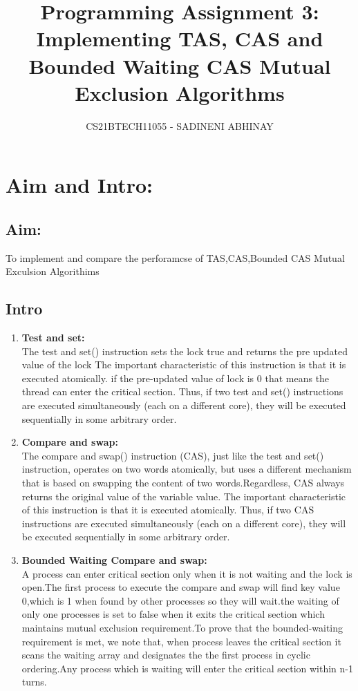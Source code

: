 \documentclass[10pt,a4paper]{article}
\title{
Programming Assignment 3:
Implementing TAS, CAS and Bounded Waiting CAS
Mutual Exclusion Algorithms }
\author{CS21BTECH11055 - SADINENI ABHINAY}
\begin{document}
	\maketitle
	\section{Aim and Intro:}
	\subsection{Aim:}
	To implement and compare the perforamcse of TAS,CAS,Bounded CAS Mutual Exculsion Algorithims
	\subsection{Intro}
	\begin{enumerate}
		\item \textbf{Test and set:}\\
		 The test and set() instruction sets the lock true and returns the pre updated value of the lock 
		 The important characteristic of this instruction is that it is executed atomically. if the pre-updated value of lock is 0 that means the thread can enter the critical section.
		 Thus, if two test and set() instructions are executed simultaneously
		 (each on a different core), they will be executed sequentially in some arbitrary
		 order.
		 \item \textbf{Compare and swap:}\\
		 The compare and swap() instruction (CAS), just like the test and set()
		 instruction, operates on two words atomically, but uses a different mechanism that is based on swapping the content of two words.Regardless, CAS always returns the original value of
		 the variable value. The important characteristic of this instruction is that it is
		 executed atomically. Thus, if two CAS instructions are executed simultaneously
		 (each on a different core), they will be executed sequentially in some arbitrary
		 order.
		 \item \textbf{Bounded Waiting Compare and swap:}\\
		 A process can enter critical section only when it is not waiting and the lock is open.The first process to execute the compare and swap will find key value 0,which is 1 when found by other processes so they will wait.the waiting of only one processes is set to false when it exits the critical section which maintains mutual exclusion requirement.To prove that the bounded-waiting requirement is met, we note that, when process leaves the 
		 critical section it scans the waiting array and designates the the first process in cyclic ordering.Any process which is waiting will enter the critical section within n-1 turns. 
		
	\end{enumerate}
\end{document}
